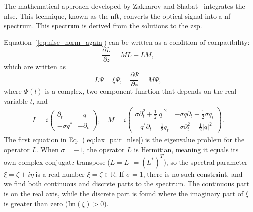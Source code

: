 The mathematical approach developed by Zakharov and Shabat~\cite{zakharov1972exact} integrates the \acrshort{nlse}. This technique, known as the \acrlong{nft}, converts the optical signal into a \acrfull{nf} spectrum. This spectrum is derived from the solutions to the \acrfull{zsp}.

Equation~(\ref{eq:nlse_norm_again}) can be written as a condition of compatibility:
\begin{equation}
    \frac{\partial L}{\partial z} = ML - LM,
\end{equation}
which are written as
\begin{equation}
    L\Psi = \xi \Psi, \quad \frac{\partial \Psi}{\partial z} = M\Psi,
    \label{eq:lax_pair_nlse}
\end{equation}
where \(\Psi(t)\) is a complex, two-component function that depends on the real variable \(t\), and
\begin{align}
    L = i \begin{pmatrix} \partial_t & -q \\ -\sigma q^* & -\partial_t \end{pmatrix}, \quad
    M = i \begin{pmatrix}  \sigma \partial_t^2 + \frac{1}{2} |q|^2  & -\sigma q \partial_t - \frac{1}{2} \sigma q_t \\
    -q^* \partial_t - \frac{1}{2} q_t & - \sigma \partial_t^2 - \frac{1}{2} |q|^2  \end{pmatrix}.
    \label{eq:nlse_l_and_m}
\end{align}
The first equation in Eq.~(\ref{eq:lax_pair_nlse}) is the eigenvalue problem for the operator \(L\). When \(\sigma = -1\), the operator \(L\) is Hermitian, meaning it equals its own complex conjugate transpose (\(L = L^\dagger = (L^*)^T\)), so the spectral parameter \(\xi = \zeta + i\eta\) is a real number \(\xi = \zeta\in \mathbb{R}\). If \(\sigma = 1\), there is no such constraint, and we find both continuous and discrete parts to the spectrum. The continuous part is on the real axis, while the discrete part is found where the imaginary part of \(\xi\) is greater than zero (\(\text{Im}(\xi) > 0\)).

